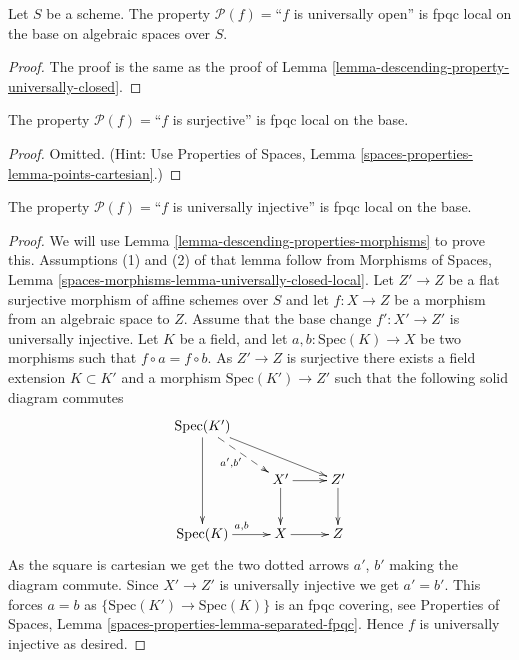 \begin{lemma}
\label{lemma-descending-property-universally-open}
Let $S$ be a scheme.
The property $\mathcal{P}(f) =$``$f$ is universally open''
is fpqc local on the base on algebraic spaces over $S$.
\end{lemma}

\begin{proof}
The proof is the same as the proof of
Lemma \ref{lemma-descending-property-universally-closed}.
\end{proof}

\begin{lemma}
\label{lemma-descending-property-surjective}
The property $\mathcal{P}(f) =$``$f$ is surjective''
is fpqc local on the base.
\end{lemma}

\begin{proof}
Omitted. (Hint: Use
Properties of Spaces, Lemma \ref{spaces-properties-lemma-points-cartesian}.)
\end{proof}

\begin{lemma}
\label{lemma-descending-property-universally-injective}
The property $\mathcal{P}(f) =$``$f$ is universally injective''
is fpqc local on the base.
\end{lemma}

\begin{proof}
We will use
Lemma \ref{lemma-descending-properties-morphisms}
to prove this. Assumptions (1) and (2) of that lemma follow from
Morphisms of Spaces,
Lemma \ref{spaces-morphisms-lemma-universally-closed-local}.
Let $Z' \to Z$ be a flat surjective morphism of affine schemes
over $S$ and let $f : X \to Z$ be a morphism from an algebraic space to $Z$.
Assume that the base change $f' : X' \to Z'$ is universally injective.
Let $K$ be a field, and let $a, b : \text{Spec}(K) \to X$
be two morphisms such that $f \circ a = f \circ b$.
As $Z' \to Z$ is surjective there exists a field
extension $K \subset K'$ and a morphism
$\text{Spec}(K') \to Z'$
such that the following solid diagram commutes
$$
\xymatrix{
\text{Spec}(K') \ar[rrd] \ar@{-->}[rd]_{a', b'} \ar[dd] \\
 &
X' \ar[r] \ar[d] &
Z' \ar[d] \\
\text{Spec}(K) \ar[r]^{a, b} &
X \ar[r] &
Z
}
$$
As the square is cartesian we get the two dotted arrows $a'$, $b'$ making the
diagram commute. Since $X' \to Z'$ is universally injective we get $a' = b'$.
This forces $a = b$ as $\{\text{Spec}(K') \to \text{Spec}(K)\}$
is an fpqc covering, see
Properties of Spaces, Lemma \ref{spaces-properties-lemma-separated-fpqc}.
Hence $f$ is universally injective as desired.
\end{proof}

